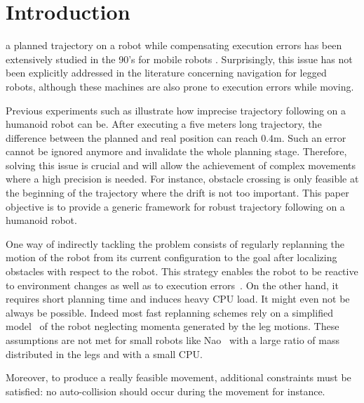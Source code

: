 \section{Introduction}

 a planned trajectory on a robot while
compensating execution errors has been extensively studied in the 90's
for mobile robots \cite{91icra.samson,
  98deLucaOrioloSamson}. Surprisingly, this issue has not been
explicitly addressed in the literature concerning navigation for
legged robots, although these machines are also prone to execution
errors while moving.

Previous experiments such as \cite{11humanoids.baudouin} illustrate
how imprecise trajectory following on a humanoid robot can be. After
executing a five meters long trajectory, the difference between the
planned and real position can reach $0.4 \textrm{m}$. Such an error
cannot be ignored anymore and invalidate the whole planning
stage. Therefore, solving this issue is crucial and will allow the
achievement of complex movements where a high precision is needed. For
instance, obstacle crossing is only feasible at the beginning of the
trajectory where the drift is not too important. This paper objective
is to provide a generic framework for robust trajectory following on a
humanoid robot.

One way of indirectly tackling the problem consists of regularly
replanning the motion of the robot from its current configuration to
the goal after localizing obstacles with respect to the robot. This
strategy enables the robot to be reactive to environment changes as
well as to execution errors~\cite{05humanoids.michel,
  06icra.MichelChestnut,10springer.chestnut}. On the other hand, it
requires short planning time and induces heavy CPU load. It might even
not be always be possible. Indeed most fast replanning schemes rely on
a simplified model~\cite{01icra.KajitaKanehiro} of the robot
neglecting momenta generated by the leg motions. These assumptions are
not met for small robots like Nao~\cite{wikipedia.nao} with a large
ratio of mass distributed in the legs and with a small CPU.

Moreover, to produce a really feasible movement, additional
constraints must be satisfied: no auto-collision should occur during
the movement for instance.


